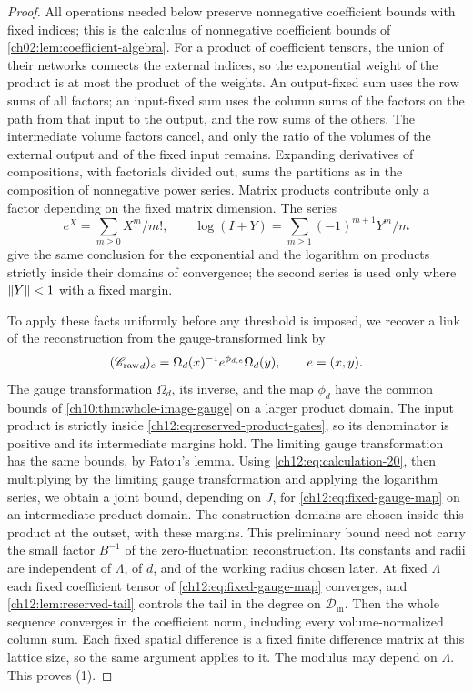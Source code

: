 \begin{proof}
All operations needed below preserve nonnegative coefficient bounds with fixed indices; this is the calculus of nonnegative coefficient bounds of \cref{ch02:lem:coefficient-algebra}. For a product of coefficient tensors, the union of their networks connects the external indices, so the exponential weight of the product is at most the product of the weights. An output-fixed sum uses the row sums of all factors; an input-fixed sum uses the column sums of the factors on the path from that input to the output, and the row sums of the others. The intermediate volume factors cancel, and only the ratio of the volumes of the external output and of the fixed input remains. Expanding derivatives of compositions, with factorials divided out, sums the partitions as in the composition of nonnegative power series. Matrix products contribute only a factor depending on the fixed matrix dimension. The series
\[
 e^X=\sum_{m\ge0}X^m/m!,\qquad \log(I+Y)=\sum_{m\ge1}(-1)^{m+1}Y^m/m
\]
give the same conclusion for the exponential and the logarithm on products strictly inside their domains of convergence; the second series is used only where $\lVert Y\rVert<1$ with a fixed margin.

To apply these facts uniformly before any threshold is imposed, we recover a link of the reconstruction from the gauge-transformed link by
\begin{equation}
 ({\mathscr C_{\mathrm{raw}}}_d)_e=\Omega_d(x)^{-1}e^{\phi_{d,e}}\Omega_d(y),\qquad e=(x,y). \label{ch12:eq:calculation-20}
\end{equation}
The gauge transformation $\Omega_d$, its inverse, and the map $\phi_d$ have the common bounds of \cref{ch10:thm:whole-image-gauge} on a larger product domain. The input product is strictly inside \eqref{ch12:eq:reserved-product-gates}, so its denominator is positive and its intermediate margins hold. The limiting gauge transformation has the same bounds, by Fatou's lemma. Using \eqref{ch12:eq:calculation-20}, then multiplying by the limiting gauge transformation and applying the logarithm series, we obtain a joint bound, depending on $J$, for \eqref{ch12:eq:fixed-gauge-map} on an intermediate product domain. The construction domains are chosen inside this product at the outset, with these margins. This preliminary bound need not carry the small factor $B^{-1}$ of the zero-fluctuation reconstruction. Its constants and radii are independent of $\Lambda$, of $d$, and of the working radius chosen later. At fixed $\Lambda$ each fixed coefficient tensor of \eqref{ch12:eq:fixed-gauge-map} converges, and \cref{ch12:lem:reserved-tail} controls the tail in the degree on $\mathscr D_{\mathrm{in}}$. Then the whole sequence converges in the coefficient norm, including every volume-normalized column sum. Each fixed spatial difference is a fixed finite difference matrix at this lattice size, so the same argument applies to it. The modulus may depend on $\Lambda$. This proves (1).


\end{proof}
